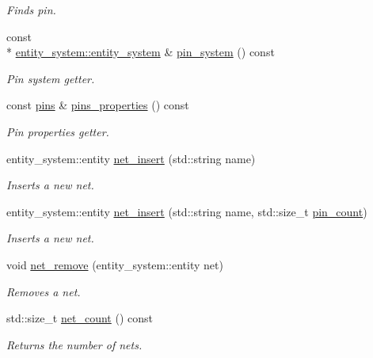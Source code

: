 \begin{DoxyCompactItemize}
\begin{DoxyCompactList}\small\item\em Finds pin. \end{DoxyCompactList}\item 
const \\*
\hyperlink{classophidian_1_1entity__system_1_1entity__system}{entity\-\_\-system\-::entity\-\_\-system} \& \hyperlink{classophidian_1_1netlist_1_1netlist_aed3feabbc1591ae3bdf002fb77f4b04b}{pin\-\_\-system} () const 
\begin{DoxyCompactList}\small\item\em Pin system getter. \end{DoxyCompactList}\item 
const \hyperlink{classophidian_1_1netlist_1_1pins}{pins} \& \hyperlink{classophidian_1_1netlist_1_1netlist_af7026a773f912f287495378871c98f92}{pins\-\_\-properties} () const 
\begin{DoxyCompactList}\small\item\em Pin properties getter. \end{DoxyCompactList}\item 
entity\-\_\-system\-::entity \hyperlink{classophidian_1_1netlist_1_1netlist_a362a4b72d5b6c0a2ddf3e1bb4fb79de3}{net\-\_\-insert} (std\-::string name)
\begin{DoxyCompactList}\small\item\em Inserts a new net. \end{DoxyCompactList}\item 
entity\-\_\-system\-::entity \hyperlink{classophidian_1_1netlist_1_1netlist_ac32bc6c9118aa9e99b856284d7339f26}{net\-\_\-insert} (std\-::string name, std\-::size\-\_\-t \hyperlink{classophidian_1_1netlist_1_1netlist_ad7ca89ecd797580236cbf4203c0298b7}{pin\-\_\-count})
\begin{DoxyCompactList}\small\item\em Inserts a new net. \end{DoxyCompactList}\item 
void \hyperlink{classophidian_1_1netlist_1_1netlist_abe2c2f66f378422fb86b983a8d14aca5}{net\-\_\-remove} (entity\-\_\-system\-::entity net)
\begin{DoxyCompactList}\small\item\em Removes a net. \end{DoxyCompactList}\item 
std\-::size\-\_\-t \hyperlink{classophidian_1_1netlist_1_1netlist_a30f3c26fbf0bd3ca1686aa0bc6f72314}{net\-\_\-count} () const 
\begin{DoxyCompactList}\small\item\em Returns the number of nets. \end{DoxyCompactList}\item 

\end{DoxyCompactItemize}
